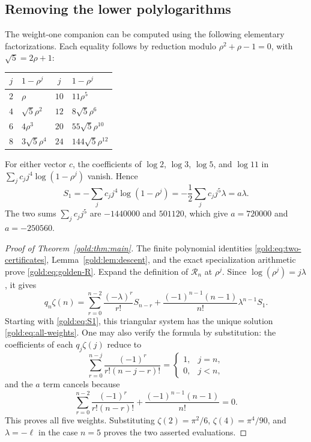 \subsection{Removing the lower polylogarithms}

The weight-one companion can be computed using the following elementary
factorizations.  Each equality follows by reduction modulo
$\rho^2+\rho-1=0$, with $\sqrt5=2\rho+1$:
\begin{center}
\begin{tabular}{c|l@{\qquad}c|l}
$j$&$1-\rho^j$&$j$&$1-\rho^j$\\ \hline
$2$&$\rho$&$10$&$11\rho^5$\\
$4$&$\sqrt5\rho^2$&$12$&$8\sqrt5\rho^6$\\
$6$&$4\rho^3$&$20$&$55\sqrt5\rho^{10}$\\
$8$&$3\sqrt5\rho^4$&$24$&$144\sqrt5\rho^{12}$
\end{tabular}
\end{center}
For either vector $c$, the coefficients of $\log2$, $\log3$,
$\log5$, and $\log11$ in
$\sum_j c_jj^4\log(1-\rho^j)$ vanish.  Hence
\begin{equation}
 S_1=-\sum_jc_jj^4\log(1-\rho^j)
     =-\frac12\sum_jc_jj^5\lambda=a\lambda.
 \label{gold:eq:S1}
\end{equation}
The two sums $\sum_j c_jj^5$ are $-1440000$ and $501120$,
which give $a=720000$ and $a=-250560$.

\begin{proof}[Proof of Theorem~\ref{gold:thm:main}]
The finite polynomial identities \eqref{gold:eq:two-certificates},
Lemma~\ref{gold:lem:descent}, and the exact specialization arithmetic
prove \eqref{gold:eq:golden-R}.  Expand the definition of
$\mathcal R_n$ at $\rho^j$.  Since $\log(\rho^j)=j\lambda$, it gives
\begin{equation}
 q_n\zeta(n)=
 \sum_{r=0}^{n-2}\frac{(-\lambda)^r}{r!}S_{n-r}
 +\frac{(-1)^{n-1}(n-1)}{n!}\lambda^{n-1}S_1.
 \label{gold:eq:triangular}
\end{equation}
Starting with \eqref{gold:eq:S1}, this triangular system has the unique
solution \eqref{gold:eq:all-weights}.  One may also verify the formula
by substitution: the coefficients of each $q_j\zeta(j)$ reduce to
\[
 \sum_{r=0}^{n-j}\frac{(-1)^r}{r!(n-j-r)!}
   =\begin{cases}1,&j=n,\\0,&j<n,\end{cases}
\]
and the $a$ term cancels because
\[
 \sum_{r=0}^{n-2}\frac{(-1)^r}{r!(n-r)!}
   +\frac{(-1)^{n-1}(n-1)}{n!}=0.
\]
This proves all five weights.  Substituting
$\zeta(2)=\pi^2/6$, $\zeta(4)=\pi^4/90$, and $\lambda=-\ell$ in
the case $n=5$ proves the two asserted evaluations.
\end{proof}

